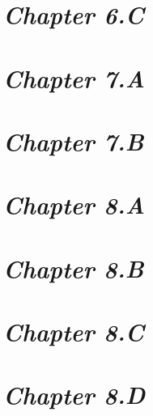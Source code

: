 \documentclass[a4paper,12pt]{article}
\begin{document}
    \newpage

    \section{\large \textit{Chapter 6.C}}

    

    \newpage

    \section{\large \textit{Chapter 7.A}}

    

    \newpage

    \section{\large \textit{Chapter 7.B}}

    

    \newpage

    \section{\large \textit{Chapter 8.A}}

    

    \newpage

    \section{\large \textit{Chapter 8.B}}

    

    \newpage

    \section{\large \textit{Chapter 8.C}}

    

    \newpage

    \section{\large \textit{Chapter 8.D}}

    
\end{document}
